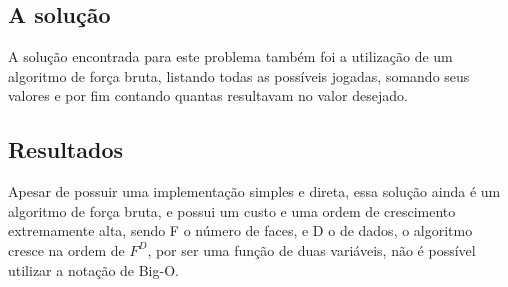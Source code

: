 \documentclass[letterpaper,12pt]{article}
\begin{document}
\subsection{A solução}
A solução encontrada para este problema também foi a utilização de um algoritmo de força bruta, listando todas as possíveis jogadas, somando seus valores e por fim contando quantas resultavam no valor desejado.

\subsection{Resultados}
Apesar de possuir uma implementação simples e direta, essa solução ainda é um algoritmo de força bruta, e possui um custo e uma ordem de crescimento extremamente alta, sendo F o número de faces, e D o de dados, o algoritmo cresce na ordem de $F^D$, por ser uma função de duas variáveis, não é possível utilizar a notação de Big-O.
\end{document}
